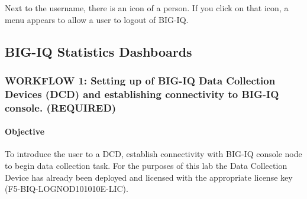 \documentclass[letterpaper,10pt,english]{sphinxmanual}
\begin{document}

Next to the username, there is an icon of a person. If you click on that
icon, a menu appears to allow a user to logout of BIG-IQ.



\subsection{BIG-IQ Statistics Dashboards}
\label{\detokenize{class1/module4/lab4:big-iq-statistics-dashboards}}\label{\detokenize{class1/module4/lab4::doc}}

\subsubsection{WORKFLOW 1: Setting up of BIG-IQ Data Collection Devices (DCD) and establishing connectivity to BIG-IQ console. (REQUIRED)}
\label{\detokenize{class1/module4/lab4:workflow-1-setting-up-of-big-iq-data-collection-devices-dcd-and-establishing-connectivity-to-big-iq-console-required}}

\paragraph{Objective}
\label{\detokenize{class1/module4/lab4:objective}}
To introduce the user to a DCD, establish connectivity with BIG-IQ
console node to begin data collection task. For the purposes of this lab
the Data Collection Device has already been deployed and licensed with
the appropriate license key (F5-BIQ-LOGNOD101010E-LIC).
\end{document}
